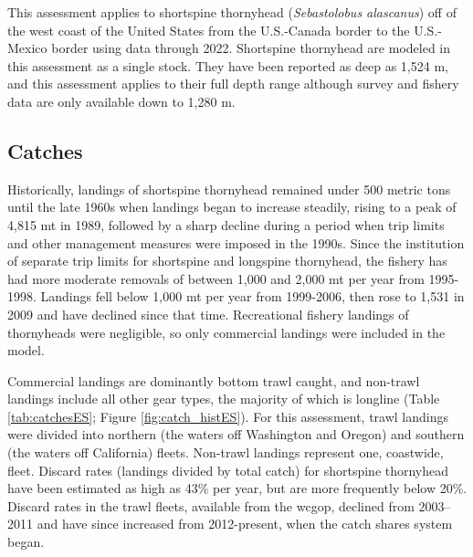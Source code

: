 \documentclass[11pt,
  english,
  letterpaper,
]{article}
\begin{document}
This assessment applies to shortspine thornyhead (\emph{Sebastolobus alascanus}) off of the west coast of the United States from the U.S.-Canada border to the U.S.-Mexico border using data through 2022. Shortspine thornyhead are modeled in this assessment as a single stock. They have been reported as deep as 1,524 m, and this assessment applies to their full depth range although survey and fishery data are only available down to 1,280 m.

\hypertarget{catches}{%
\subsection*{Catches}\label{catches}}

Historically, landings of shortspine thornyhead remained under 500 metric tons until the late 1960s when landings began to increase steadily, rising to a peak of 4,815 mt in 1989, followed by a sharp decline during a period when trip limits and other management measures were imposed in the 1990s. Since the institution of separate trip limits for shortspine and longspine thornyhead, the fishery has had more moderate removals of between 1,000 and 2,000 mt per year from 1995-1998. Landings fell below 1,000 mt per year from 1999-2006, then rose to 1,531 in 2009 and have declined since that time. Recreational fishery landings of thornyheads were negligible, so only commercial landings were included in the model.

Commercial landings are dominantly bottom trawl caught, and non-trawl landings include all other gear types, the majority of which is longline (Table \ref{tab:catchesES}; Figure \ref{fig:catch_histES}). For this assessment, trawl landings were divided into northern (the waters off Washington and Oregon) and southern (the waters off California) fleets. Non-trawl landings represent one, coastwide, fleet. Discard rates (landings divided by total catch) for shortspine thornyhead have been estimated as high as 43\% per year, but are more frequently below 20\%. Discard rates in the trawl fleets, available from the \gls{wcgop}, declined from 2003--2011 and have since increased from 2012-present, when the catch shares system began.

\begingroup\fontsize{10}{12}\selectfont
\begingroup\fontsize{10}{12}\selectfont
\end{document}
